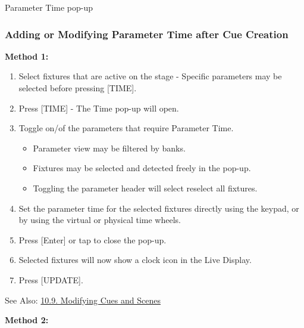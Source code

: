 \documentclass[
]{article}
\begin{document}
Parameter Time pop-up

\hypertarget{adding-or-modifying-parameter-time-after-cue-creation}{%
\subsubsection{Adding or Modifying Parameter Time after Cue Creation}\label{adding-or-modifying-parameter-time-after-cue-creation}}

\textbf{Method 1:}

\begin{enumerate}
\def\labelenumi{\arabic{enumi}.}
\item
  Select fixtures that are active on the stage - Specific parameters may be selected before pressing {[}TIME{]}.
\item
  Press {[}TIME{]} - The Time pop-up will open.
\item
  Toggle on/of the parameters that require Parameter Time.

  \begin{itemize}
  \item
    Parameter view may be filtered by banks.
  \item
    Fixtures may be selected and detected freely in the pop-up.
  \item
    Toggling the parameter header will select reselect all fixtures.
  \end{itemize}
\item
  Set the parameter time for the selected fixtures directly using the keypad, or by using the virtual or physical time wheels.
\item
  Press {[}Enter{]} or tap \href{image.png}{} to close the pop-up.
\item
  Selected fixtures will now show a clock icon in the Live Display.
\item
  Press {[}UPDATE{]}.
\end{enumerate}

See Also: \href{https://vibemanual.compulite.com/programming-cues-and-scenes.html\#modifying-cues-and-scenes}{10.9. Modifying Cues and Scenes}

\textbf{Method 2:}
\end{document}
